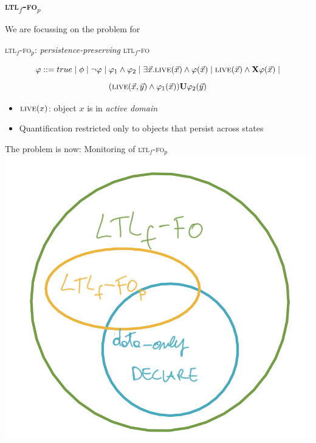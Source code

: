 \documentclass[xcolor=dvipsnames]{beamer}
\newcommand{\nextX}{\mathbf{X}\xspace}
\newcommand{\ltlX}{\nextX}
\newcommand{\ltlU}{\mathbf{U}}
\newcommand{\true}{true}
\newcommand{\live}{\textsc{live}}
\newcommand{\ltlf}{\textsc{ltl}$_f$\xspace}
\newcommand{\ltlffo}{\ltlf-\textsc{fo}\xspace}
\newcommand{\ltlffop}{\ltlf-\textsc{fo}$_p$\xspace}
\begin{document}


\begin{frame}
\frametitle{\ltlffop}

We are focussing on the problem for 
\begin{center}
	\ltlffop: \emph{persistence-preserving} \ltlffo
\end{center}
\[\varphi ::= \true \mid \phi \mid \lnot \varphi \mid \varphi_1 \land \varphi_2 \mid 
\exists \vec x.\live(\vec x)\land\varphi(\vec x) \mid
\live(\vec x)\land \ltlX\varphi(\vec x)  \mid\]
\[(\live(\vec x, \vec y)\land \varphi_1(\vec x)) \ltlU \varphi_2(\vec y)\]
\begin{itemize}	
	\item $\live(x)$: object $x$ is in \emph{active domain}
	\item Quantification restricted only to objects that persist across states
\end{itemize}

The problem is now: Monitoring of  \ltlffop \includegraphics[scale=.2]{figures/ltlp-declare}

\end{frame}

\end{document}
